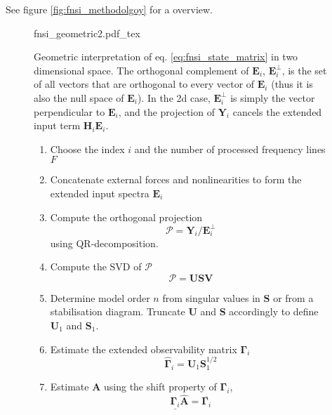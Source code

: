 See figure \ref{fig:fnsi_methodolgoy} for a overview.

\begin{figure}[!ht]
  \centering
  \def\svgwidth{6cm}
  {fnsi_geometric2.pdf_tex}
  \caption{Geometric interpretation of eq. \eqref{eq:fnsi_state_matrix} in two
    dimensional space. The orthogonal complement of $\bm E_i$, $\bm E_i^\perp$,
    is the set of all vectors that are orthogonal to every vector of $\bm E_i$
    (thus it is also the null space of $\bm E_i$).
    In the 2d case, $\bm E_i^\perp$ is simply the vector perpendicular to $\bm
    E_i$, and the projection of $\bm Y_i$ cancels the extended input term $\bm
    H_i \bm E_i$.
  }
  \label{fig:fnsi_geometric}
\end{figure}


\begin{figure}[!ht]
  \centering
  \begin{mdframed}
    \begin{enumerate}
    \item Choose the index $i$ and the number of processed frequency lines $F$
    \item Concatenate external forces and nonlinearities to form the extended
      input spectra $\bm E_i$
    \item Compute the orthogonal projection
      \begin{equation*}
        \mathcal{P} = \bm Y_i / \bm E_i^\perp
      \end{equation*}
      using QR-decomposition.
    \item Compute the SVD of $\mathcal{P}$
      \begin{equation}
        \label{eq:fnsi_svd}
        \mathcal{P} = \bm U \bm S \bm V
      \end{equation}
    \item Determine model order $n$ from singular values in $\bm S$ or from a
      stabilisation diagram. Truncate $\bm U$ and $\bm S$ accordingly to define
      $\bm U_1$ and $\bm S_1$.
    \item Estimate the extended observability matrix $\bm \Gamma_i$
      \begin{equation*}
        \hat{\bm \Gamma}_i = \bm U_1 \bm S_1^{1/2}
      \end{equation*}
    \item Estimate $\bm A$ using the shift property of $\bm \Gamma_i$,
      \begin{equation*}
        \underline{\bm \Gamma_i} \hat {\bm A} = \overline{\bm \Gamma_i}

\end{equation*}
\end{enumerate}
\end{mdframed}
\end{figure}
